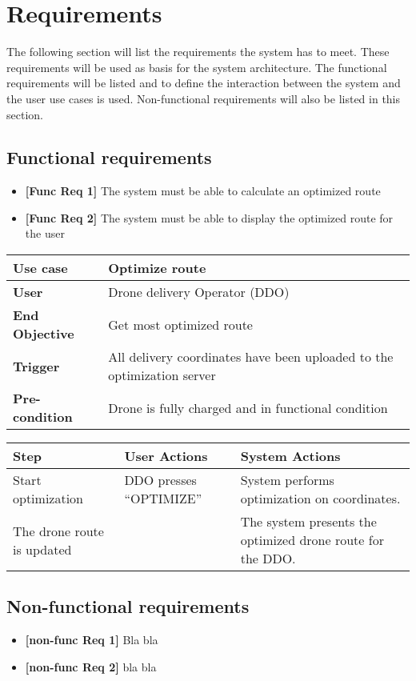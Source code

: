 
\chapter{Requirements}

The following section will list the requirements the system has to meet. These requirements will be used as basis for the system architecture. The functional requirements will be listed and to define the interaction between the system and the user use cases is used. Non-functional requirements will also be listed in this section. 

\section{Functional requirements}
\begin{itemize}
	\item \textbf{[Func Req 1]} The system must be able to calculate an optimized route
	\item \textbf{[Func Req 2]} The system must be able to display the optimized route for the user
\end{itemize}

\begin{table}[H]
	\begin{tabular}{|l|l|}
		\hline
		\cellcolor[HTML]{EFEFEF} \textbf{Use case}  & \cellcolor[HTML]{EFEFEF} \textbf{Optimize route}\\ \hline
		\cellcolor[HTML]{EFEFEF} \textbf{User} &  Drone delivery Operator (DDO) \\ \hline
		\cellcolor[HTML]{EFEFEF} \textbf{End Objective} &  Get most optimized route\\ \hline
		\cellcolor[HTML]{EFEFEF} \textbf{Trigger} & All delivery coordinates have been uploaded to the optimization server \\ \hline 
		\cellcolor[HTML]{EFEFEF} \textbf{Pre-condition} & Drone is fully charged and in functional condition \\ \hline
	\end{tabular}
\end{table}

\begin{table}[H]
	\begin{tabular}{|l|l|l|}
		\hline
		\cellcolor[HTML]{EFEFEF} \textbf{Step}  & \cellcolor[HTML]{EFEFEF} \textbf{User Actions}   & \cellcolor[HTML]{EFEFEF} \textbf{System Actions} \\ \hline
		\cellcolor[HTML]{EFEFEF} Start optimization  &  DDO presses “OPTIMIZE”   &  \makecell{ System performs \\ optimization on coordinates.} \\ \hline
		\cellcolor[HTML]{EFEFEF} The drone route is updated   &     &  The system presents the optimized drone route for the DDO.  \\ \hline
	\end{tabular}
\end{table}


\section{Non-functional requirements}
\begin{itemize}
	\item \textbf{[non-func Req 1]} Bla bla
	\item \textbf{[non-func Req 2]} bla bla
\end{itemize}